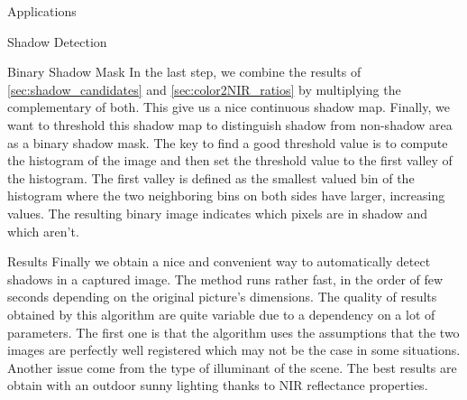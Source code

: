 \documentclass[10pt]{article}
\begin{document}
\begin{section}{Applications}
\begin{subsection}{Shadow Detection}
        \begin{subsubsection}{Binary Shadow Mask}
            \label{sec:binary_shadow_mask}
            In the last step, we combine the results of \ref{sec:shadow_candidates} and \ref{sec:color2NIR_ratios} by multiplying the complementary of both. This give us a nice continuous shadow map. Finally, we want to threshold this shadow map to distinguish shadow from non-shadow area as a binary shadow mask. The key to find a good threshold value is to compute the histogram of the image and then set the threshold value to the first valley of the histogram. The first valley is defined as the smallest valued bin of the histogram where the two neighboring bins on both sides have larger, increasing values. The resulting binary image indicates which pixels are in shadow and which aren't.

        \end{subsubsection}

        \begin{subsubsection}{Results}
            \label{sec:shadow_results}
            Finally we obtain  a nice and convenient way to automatically detect shadows in a captured image. The method runs rather fast, in the order of few seconds depending on the original picture's dimensions. The quality of results obtained by this algorithm are quite variable due to a dependency on a lot of parameters. The first one is that the algorithm uses the assumptions that the two images are perfectly well registered which may not be the case in some situations. Another issue come from the type of illuminant of the scene. The best results are obtain with an outdoor sunny lighting thanks to NIR reflectance properties.


\end{subsubsection}
\end{subsection}
\end{section}
\end{document}
